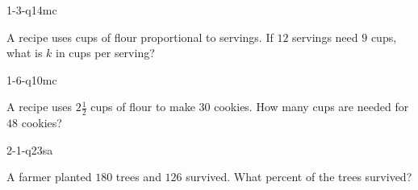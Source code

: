 \documentclass[12pt, fleqn, openany]{studyGuide}
\begin{document}
\renewcommand{\VMBookTitle}{7 Texas STAAR Grade 7 Math Practice Tests}
\renewcommand{\VMBookSubtitle}{Comprehensive Test Prep with Detailed Answers}
\renewcommand{\VMFooterURL}{https://viewmath.com/grade7}
\renewcommand{\VMFooterURLDisplay}{ViewMath.com/Grade7}






\tableofcontents
\cleardoublepage
{}


\begin{practiceQuestion}{1-3-q14}{mc}
\begin{questionText}
A recipe uses cups of flour proportional to servings. If $12$ servings need $9$ cups, what is $k$ in cups per serving?
\end{questionText}
\end{practiceQuestion}

\begin{practiceQuestion}{1-6-q10}{mc}
\begin{questionText}
A recipe uses $2\frac{1}{2}$ cups of flour to make $30$ cookies. How many cups are needed for $48$ cookies?
\end{questionText}
\end{practiceQuestion}

\begin{practiceQuestion}{2-1-q23}{sa}
\begin{questionText}
A farmer planted $180$ trees and $126$ survived. What percent of the trees survived?
\end{questionText}
\end{practiceQuestion}
\end{document}
